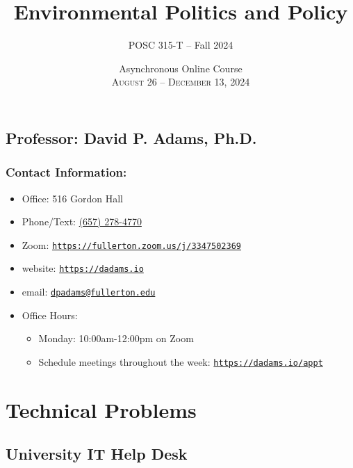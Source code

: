 \documentclass[12pt, letterpaper]{article}
\begin{document}
\title{\textbf{Environmental Politics and Policy}}

\author{POSC 315-T -- Fall 2024}
\date{Asynchronous Online Course \\ \textsc{August 26 -- December 13, 2024}}

    \maketitle


\subsection*{Professor: David P. Adams, Ph.D.}

\subsubsection*{Contact Information:}

\begin{itemize}
	\item Office: 516 Gordon Hall
	\item Phone/Text: \href{tel:+16572784770}{(657) 278-4770}
	\item Zoom: \href{https://fullerton.zoom.us/j/3347502369}{\texttt{https://fullerton.zoom.us/j/3347502369}}
	\item website: \href{https://dadams.io}{\texttt{https://dadams.io}}
	\item email: \href{dpadams@fullerton.edu}{\texttt{dpadams@fullerton.edu}}
	\item Office Hours:
        \begin{itemize}
            \item Monday: 10:00am-12:00pm on Zoom
            \item Schedule meetings throughout the week: \href{https://dadams.io/appt}{\texttt{https://dadams.io/appt}}
        \end{itemize}
            
\end{itemize}


\section*{Technical Problems}

\subsection*{University IT Help Desk}
\end{document}
